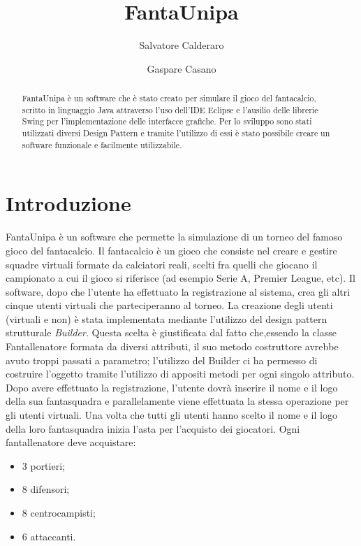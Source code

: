 \documentclass[12pt,a4paper]{article}
\title{FantaUnipa}
\author{Salvatore Calderaro \and Gaspare Casano}
\begin{document}
\date  {}
\maketitle
\thispagestyle{empty}
\newpage
\tableofcontents
\newpage
{}
\begin{abstract} 
FantaUnipa è un software che è stato creato per simulare il gioco del fantacalcio, scritto in linguaggio Java attraverso l'uso dell'IDE Eclipse e l'ausilio delle librerie Swing per l'implementazione delle interfacce grafiche. Per lo sviluppo sono stati utilizzati diversi Design Pattern e tramite l'utilizzo di essi è stato possibile creare un software funzionale e facilmente utilizzabile. 
\end{abstract}
\newpage
{}
\section{Introduzione}
FantaUnipa è un software che permette la simulazione di un torneo del famoso gioco del fantacalcio. Il fantacalcio è un gioco che consiste nel creare e gestire squadre virtuali formate da calciatori reali, scelti fra quelli che giocano il campionato a cui il gioco si riferisce (ad esempio Serie A, Premier League, etc). Il software, dopo che l'utente ha effettuato la registrazione al sistema, crea gli altri cinque utenti virtuali che parteciperanno al torneo. La creazione degli utenti (virtuali e non) è stata implementata mediante l'utilizzo del design pattern strutturale \textit{Builder}. Questa scelta è giustificata dal fatto che,essendo la classe Fantallenatore formata da diversi attributi, il suo metodo costruttore avrebbe avuto troppi  passati a parametro; l'utilizzo del Builder ci ha permesso di costruire l'oggetto tramite l'utilizzo di appositi metodi per ogni singolo attributo.\\
Dopo avere effettuato la registrazione, l'utente dovrà inserire il nome e il logo della sua fantasquadra e parallelamente viene effettuata la stessa operazione per gli utenti virtuali. Una volta che tutti gli utenti hanno scelto il nome e il logo della loro fantasquadra inizia l'asta per l'acquisto dei giocatori. Ogni fantallenatore deve acquistare:
\begin{itemize}
\item 3 portieri;
\item 8 difensori;
\item 8 centrocampisti;
\item 6 attaccanti.
\end{itemize}
\end{document}
